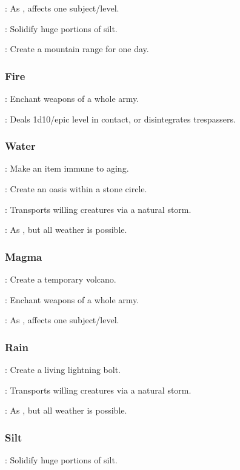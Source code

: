 : As , affects one subject/level. %

: Solidify huge portions of silt.

: Create a mountain range for one day.


\subsubsection{Fire}
: Enchant weapons of a whole army. %

: Deals 1d10/epic level in contact, or disintegrates trespassers.


\subsubsection{Water}
: Make an item immune to aging.

: Create an oasis within a stone circle.

: Transports willing creatures via a natural storm.

: As , but all weather is possible.


\subsubsection{Magma}
: Create a temporary volcano. %

: Enchant weapons of a whole army. %

: As , affects one subject/level. %


\subsubsection{Rain}
: Create a living lightning bolt. %

: Transports willing creatures via a natural storm.

: As , but all weather is possible.


\subsubsection{Silt}
: Solidify huge portions of silt.


